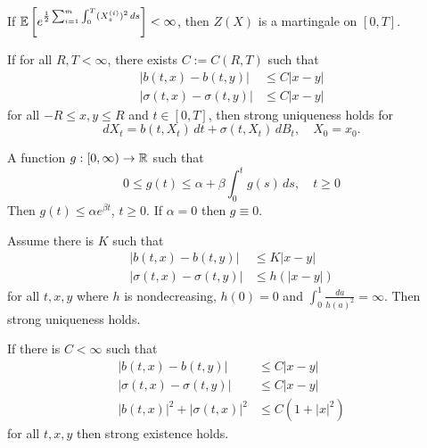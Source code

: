 \documentclass[12pt]{article}
\begin{document}
\begin{thm}
	If $\mathbb{E} \left [ e^{\frac{1}{2} \sum_{i = 1}^m \int_0^T (X_s^{(i)})^2 \, ds } \right ] < \infty$, then $Z(X)$ is a martingale on $[0, T]$. 
\end{thm}

\begin{thm}
	If for all $R, T < \infty$, there exists $C := C(R, T)$ such that 
	\begin{align*}
		|b(t, x) - b(t, y)| & \leq C |x-y| \\
		|\sigma(t, x) - \sigma(t, y)| & \leq C |x-y|
	\end{align*}
	for all $-R \leq x, y \leq R$ and $t \in [0, T]$, then strong uniqueness holds for 
	\[
		dX_t = b(t, X_t) \, dt + \sigma(t, X_t) \, dB_t, \quad X_0 = x_0.	
	\]
\end{thm}

\begin{lem}
	A function $g : [0, \infty) \to \mathbb{R}$ such that 
	\[
		0 \leq g(t) \leq \alpha + \beta \int_0^t g(s) \, ds, \quad t \geq 0	
	\]
	Then $g(t) \leq \alpha e^{\beta t}$, $t \geq 0$. If $\alpha = 0$ then $g \equiv 0$. 
\end{lem}

\begin{thm}
	Assume there is $K$ such that 
	\begin{align*}
		|b(t, x) - b(t, y)| & \leq K|x-y| \\
		|\sigma(t, x) - \sigma(t, y)| & \leq h(|x-y|)
	\end{align*}
	for all $t, x, y$ where $h$ is nondecreasing, $h(0) = 0$ and $\int_0^1 \frac{da}{h(a)^2} = \infty$. Then strong uniqueness holds. 
\end{thm}

\begin{thm}
	If there is $C < \infty$ such that 
	\begin{align*}
		|b(t, x) - b(t, y)| & \leq C |x - y| \\
		|\sigma(t, x) - \sigma(t, y)| & \leq C |x-y| \\
		|b(t, x)|^2 + |\sigma(t, x)|^2 & \leq C (1 + |x|^2)
	\end{align*}
	for all $t, x, y$ then strong existence holds. 
\end{thm}
\end{document}
